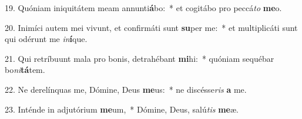 19. Quóniam iniquitátem meam annunti\textbf{á}bo:~*  et cogitábo pro peccá\textit{to} \textbf{me}o.\

20. Inimíci autem mei vivunt, et confirmáti sunt \textbf{su}per me:~*  et multiplicáti sunt qui odérunt me \textit{in}\textbf{í}que.\

21. Qui retríbuunt mala pro bonis, detrahébant \textbf{mi}hi:~*  quóniam sequébar bo\textit{ni}\textbf{tá}tem.\

22. Ne derelínquas me, Dómine, Deus \textbf{me}us:~*  ne discésse\textit{ris} \textbf{a} me.\

23. Inténde in adjutórium \textbf{me}um,~*  Dómine, Deus, salú\textit{tis} \textbf{me}æ.\

